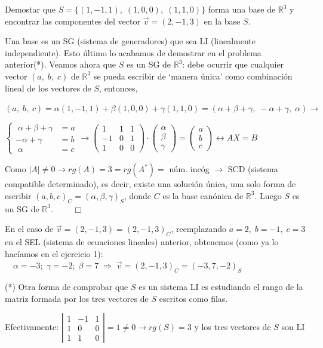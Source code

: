 \begin{ejre}
	Demostar que $S=\{ (1,-1,1),\; (1,0,0),\; (1,1,0) \}$ forma una base de $\mathbb R^3$ y encontrar las componentes del vector $\vec v=(2,-1,3)$ en la base $S$.
\end{ejre}
\begin{proofw}\renewcommand{\qedsymbol}{$\diamond$}
	Una base es un SG (sistema de generadores) que sea LI (linealmente independiente). Esto último lo acabamos de demostrar en el problema anterior(*). Veamos ahora que $S$ es un SG de $\mathbb R^3$: debe ocurrir que cualquier vector $(a, \; b, \; c)$ de $\mathbb R^3$ se pueda escribir de `manera única' como combinación lineal de los vectores de $S$, entonces,

\noindent $(a, \; b, \; c)=\alpha (1,-1,1)+  \beta (1,0,0)+ \gamma (1,1,0)=(\alpha+\beta+\gamma, \; -\alpha+\gamma,\; \alpha) \to$

\noindent $\begin{cases} \; \alpha+\beta+\gamma&=a\\ -\alpha+\gamma&=b\\ \; \alpha&=c \end{cases} \to \left( \begin{matrix} 1&1&1\\-1&0&1\\1&0&0 \end{matrix} \right)\cdot \left( \begin{matrix} \alpha \\ \beta \\ \gamma \end{matrix} \right)=\left( \begin{matrix} a \\ b \\c \end{matrix} \right) \leftrightarrow AX=B$

\noindent Como $|A|\neq 0 \to rg(A)=3=rg(A^*)=$ núm. incóg $\to$ SCD (sistema compatible determinado), es decir, existe una solución única, una solo forma de escribir $(a,b,c)_C=(\alpha,\beta,\gamma)_S$, donde $C$ es la base canónica de $\mathbb R^3$. Luego $S$ es un SG de  $\mathbb R^3$. $\qquad \Box$

\noindent En el caso de $\vec v=(2,-1,3)=(2,-1,3)_C$, reemplazando $a=2, \; b=-1, \; c=3$ en el SEL (sistema de ecuaciones lineales) anterior, obtenemos (como ya lo hacíamos en el ejercicio 1):  $\quad \alpha=-3; \; \gamma=-2; \; \beta=7 \; \Rightarrow  \; \vec v=(2,-1,3)_C=(-3,7,-2)_S$
	
	
\noindent \textcolor{gris}{(*) Otra forma de comprobar que $S$ es un sistema LI es estudiando el rango de la matriz formada por los tres vectores de $S$ escritos como filas.}

\noindent \textcolor{gris}{Efectivamente: $\left| \begin{matrix} 1&-1&1 \\ 1&0&0 \\ 1&1&0 \end{matrix} \right| =1 \neq 0 \to rg(S)=3$ y los tres vectores de $S$ son LI}


\end{proofw}


